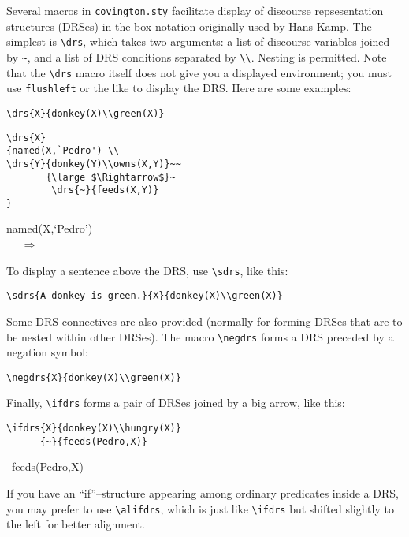 \documentclass{article}
\begin{document}
Several macros in {\tt covington.sty} facilitate display of discourse 
repsesentation structures (DRSes) in the box notation originally used by 
Hans Kamp.  The simplest is \verb"\drs", which takes two arguments:
a list of discourse variables joined by \verb"~", and a list of DRS 
conditions separated by \verb"\\".  Nesting is permitted.  Note that the 
\verb"\drs" macro itself does not give you a displayed environment; you 
must use {\tt flushleft} or the like to display the DRS.
Here are some examples:
\begin{verbatim}
\drs{X}{donkey(X)\\green(X)}
\end{verbatim}
\begin{flushleft}
\end{flushleft}
\begin{verbatim}
\drs{X}
{named(X,`Pedro') \\
\drs{Y}{donkey(Y)\\owns(X,Y)}~~
       {\large $\Rightarrow$}~
        \drs{~}{feeds(X,Y)}
}
\end{verbatim}
\begin{flushleft}
{named(X,`Pedro') \\
~~
       {\large $\Rightarrow$}~
}
\end{flushleft}
To display a sentence above the DRS, use \verb"\sdrs", like this:
\begin{verbatim}
\sdrs{A donkey is green.}{X}{donkey(X)\\green(X)}
\end{verbatim}
\begin{flushleft}
\end{flushleft}
Some DRS connectives are also provided (normally for forming
DRSes that are to be nested within other DRSes).
The macro \verb"\negdrs" forms a DRS preceded by a negation symbol:
\begin{verbatim}
\negdrs{X}{donkey(X)\\green(X)}
\end{verbatim}
\begin{flushleft}
\end{flushleft}
Finally, \verb"\ifdrs" forms a pair of DRSes joined by a big arrow,
like this:
\begin{verbatim}
\ifdrs{X}{donkey(X)\\hungry(X)}
      {~}{feeds(Pedro,X)}
\end{verbatim}
\begin{flushleft}
      {~}{feeds(Pedro,X)}
\end{flushleft}
If you have an ``if''--structure appearing among ordinary predicates 
inside a DRS, you may prefer to use \verb"\alifdrs", which is just like 
\verb"\ifdrs" but shifted slightly to the left for better alignment.
\end{document}
